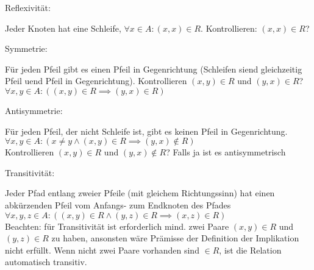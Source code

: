 \documentclass[8pt,landscape]{scrartcl}
\begin{document}
\begin{multicols}{3}
\begin{bf}Reflexivit\"at:\end{bf} Jeder Knoten hat eine Schleife, $\forall x \in A: (x, x) \in R$.
Kontrollieren: $(x, x) \in R$?\\
\begin{bf}Symmetrie:\end{bf} F\"ur jeden Pfeil gibt es einen Pfeil in Gegenrichtung (Schleifen siend gleichzeitig Pfeil uend Pfeil in Gegenrichtung).
Kontrollieren $(x, y) \in R$ und $(y, x) \in R$?\\
$\forall x, y \in A : \left( (x, y) \in R \implies (y, x) \in R \right)$\\ 
\begin{bf}Antisymmetrie:\end{bf} F\"ur jeden Pfeil, der nicht Schleife ist, gibt es keinen Pfeil in Gegenrichtung.\\
$\forall x, y \in A : \left( x \neq y \land (x, y) \in R \implies (y, x) \not\in R \right)$\\ 
Kontrollieren $(x, y) \in R$ und $(y, x) \not\in R$? Falls ja ist es antisymmetrisch\\
\begin{bf}Transitivit\"at:\end{bf} Jeder Pfad entlang zweier Pfeile (mit gleichem Richtungssinn) hat einen abk\"urzenden Pfeil vom Anfangs- zum Endknoten des Pfades\\
$\forall x, y, z \in A: \left( (x, y) \in R \land (y, z) \in R \implies (x, z) \in R \right)$\\
Beachten: f\"ur Transitivit\"at ist erforderlich mind. zwei Paare $(x, y) \in R$ und $(y, z) \in R$ zu haben, ansonsten w\"are Pr\"amisse der Definition der Implikation nicht erf\"ullt.
Wenn nicht zwei Paare vorhanden sind $\in R$, ist die Relation automatisch transitiv.



\end{multicols}
\end{document}
